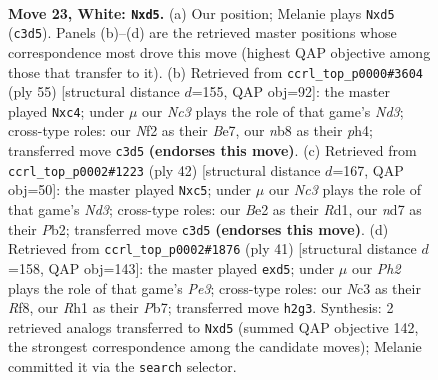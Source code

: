 \documentclass[11pt]{article}
\begin{document}
\clearpage

\begin{figure}[p]\centering
\begin{subfigure}{0.46\textwidth}\centering
\resizebox{\linewidth}{!}{%
\newchessgame
\chessboard[
  setfen={rnb3kr/3n4/2p5/pp1pP1q1/8/2N3p1/PPP1BNQP/1K1R3R w - - 0 23},
  showmover=false,
  pgfstyle=straightmove, color=movearrow, markmove={c3-d5}
]}
\caption{}
\end{subfigure}\hfill
\begin{subfigure}{0.46\textwidth}\centering
\resizebox{\linewidth}{!}{%
\newchessgame
\chessboard[
  setfen={2r2rk1/1q2b1pp/p2np3/1P5n/2P4P/3N1N2/PBQ1PPR1/2R3K1 b - - 0 28},
  showmover=false,
  pgfstyle=straightmove, color=movearrow, markmove={d6-c4}
]}
\caption{}
\end{subfigure}
\\[4pt]
\begin{subfigure}{0.46\textwidth}\centering
\resizebox{\linewidth}{!}{%
\newchessgame
\chessboard[
  setfen={1rr3k1/p2n1p2/4q2p/2pb2p1/3p4/Q2NP3/PP2BPPP/2RR2K1 w - - 0 22},
  showmover=false,
  pgfstyle=straightmove, color=movearrow, markmove={d3-c5}
]}
\caption{}
\end{subfigure}\hfill
\begin{subfigure}{0.46\textwidth}\centering
\resizebox{\linewidth}{!}{%
\newchessgame
\chessboard[
  setfen={5rk1/1p3rpp/2pqp3/p2P4/3Qn3/1P3NPP/P3PRB1/2R3K1 b - - 0 21},
  showmover=false,
  pgfstyle=straightmove, color=movearrow, markmove={e6-d5}
]}
\caption{}
\end{subfigure}
\caption{\textbf{Move 23, White: \texttt{Nxd5}.} (a) Our position; Melanie plays \texttt{Nxd5} (\texttt{c3d5}). Panels (b)--(d) are the retrieved master positions whose correspondence most drove this move (highest QAP objective among those that transfer to it). (b) Retrieved from \texttt{ccrl\_top\_p0000\#3604} (ply 55) [structural distance $d$=155, QAP obj=92]: the master played \texttt{Nxc4}; under $\mu$ our \emph{Nc3} plays the role of that game's \emph{Nd3}; cross-type roles: our \emph{N}f2 as their \emph{B}e7, our \emph{n}b8 as their \emph{p}h4; transferred move \texttt{c3d5} \textbf{(endorses this move)}. (c) Retrieved from \texttt{ccrl\_top\_p0002\#1223} (ply 42) [structural distance $d$=167, QAP obj=50]: the master played \texttt{Nxc5}; under $\mu$ our \emph{Nc3} plays the role of that game's \emph{Nd3}; cross-type roles: our \emph{B}e2 as their \emph{R}d1, our \emph{n}d7 as their \emph{P}b2; transferred move \texttt{c3d5} \textbf{(endorses this move)}. (d) Retrieved from \texttt{ccrl\_top\_p0002\#1876} (ply 41) [structural distance $d$=158, QAP obj=143]: the master played \texttt{exd5}; under $\mu$ our \emph{Ph2} plays the role of that game's \emph{Pe3}; cross-type roles: our \emph{N}c3 as their \emph{R}f8, our \emph{R}h1 as their \emph{P}b7; transferred move \texttt{h2g3}. Synthesis: 2 retrieved analogs transferred to \texttt{Nxd5} (summed QAP objective 142, the strongest correspondence among the candidate moves); Melanie committed it via the \texttt{search} selector.}
\label{fig:thought-m44}
\end{figure}
\end{document}
